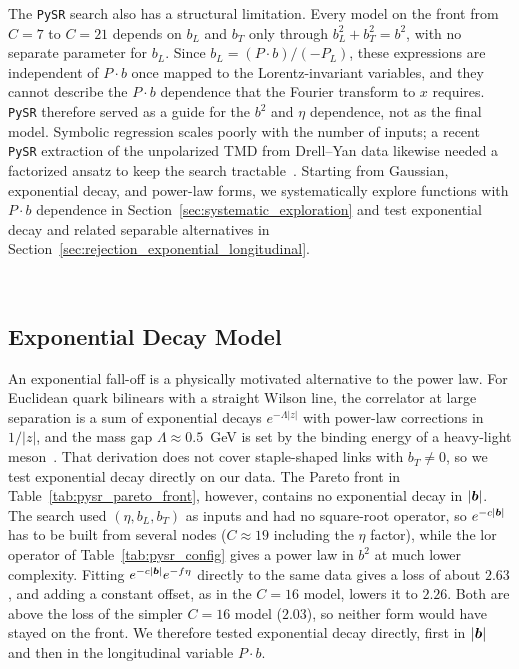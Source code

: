 The \texttt{PySR} search also has a structural limitation. Every model on the front from $C = 7$ to $C = 21$ depends on $b_L$ and $b_T$ only through $b_L^2 + b_T^2 = b^2$, with no separate parameter for $b_L$. Since $b_L = (P\cdot b)/(-P_L)$, these expressions are independent of $P\cdot b$ once mapped to the Lorentz-invariant variables, and they cannot describe the $P\cdot b$ dependence that the Fourier transform to $x$ requires. \texttt{PySR} therefore served as a guide for the $b^2$ and $\eta$ dependence, not as the final model. Symbolic regression scales poorly with the number of inputs; a recent \texttt{PySR} extraction of the unpolarized TMD from Drell--Yan data likewise needed a factorized ansatz to keep the search tractable~\cite{Granger:2026symb}. Starting from Gaussian, exponential decay, and power-law forms, we systematically explore functions with $P\cdot b$ dependence in Section~\ref{sec:systematic_exploration} and test exponential decay and related separable alternatives in Section~\ref{sec:rejection_exponential_longitudinal}.


\pagebreak~


\subsection{Exponential Decay Model}
\label{sec:exponential_failure}
An exponential fall-off is a physically motivated alternative to the power law. For Euclidean quark bilinears with a straight Wilson line, the correlator at large separation is a sum of exponential decays $e^{-\Lambda|z|}$ with power-law corrections in $1/|z|$, and the mass gap $\Lambda \approx 0.5$~GeV is set by the binding energy of a heavy-light meson~\cite{Ji:2026asym}. That derivation does not cover staple-shaped links with $b_T \neq 0$, so we test exponential decay directly on our data. The Pareto front in Table~\ref{tab:pysr_pareto_front}, however, contains no exponential decay in $|\boldsymbol{b}|$. The search used $(\eta, b_L, b_T)$ as inputs and had no square-root operator, so $e^{-c|\boldsymbol{b}|}$ has to be built from several nodes ($C \approx 19$ including the $\eta$ factor), while the $\text{lor}$ operator of Table~\ref{tab:pysr_config} gives a power law in $b^2$ at much lower complexity. Fitting $e^{-c|\boldsymbol{b}|}e^{-f\eta}$ directly to the same data gives a loss of about $2.63$, and adding a constant offset, as in the $C = 16$ model, lowers it to $2.26$. Both are above the loss of the simpler $C = 16$ model ($2.03$), so neither form would have stayed on the front. We therefore tested exponential decay directly, first in $|\boldsymbol{b}|$ and then in the longitudinal variable $P\cdot b$.

